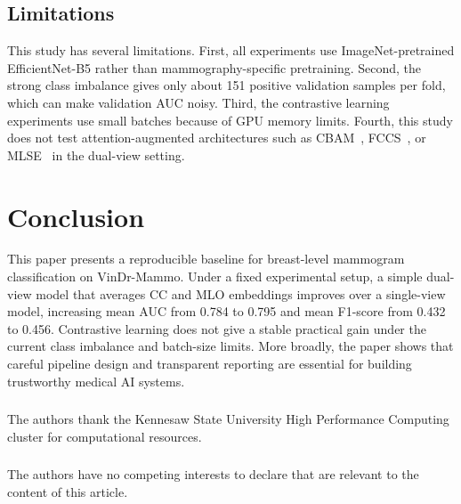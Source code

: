 \documentclass[runningheads]{llncs}
\begin{document}
\subsection{Limitations}

This study has several limitations. First, all experiments use ImageNet-pretrained EfficientNet-B5 rather than mammography-specific pretraining. Second, the strong class imbalance gives only about 151 positive validation samples per fold, which can make validation AUC noisy. Third, the contrastive learning experiments use small batches because of GPU memory limits. Fourth, this study does not test attention-augmented architectures such as CBAM~\cite{woo2018cbam}, FCCS~\cite{maurya2024fccs}, or MLSE~\cite{xie2026mlse} in the dual-view setting.

\section{Conclusion}
\label{sec:conclusion}

This paper presents a reproducible baseline for breast-level mammogram classification on VinDr-Mammo. Under a fixed experimental setup, a simple dual-view model that averages CC and MLO embeddings improves over a single-view model, increasing mean AUC from 0.784 to 0.795 and mean F1-score from 0.432 to 0.456. Contrastive learning does not give a stable practical gain under the current class imbalance and batch-size limits. More broadly, the paper shows that careful pipeline design and transparent reporting are essential for building trustworthy medical AI systems.

\begin{credits}
\subsubsection{\ackname}
The authors thank the Kennesaw State University High Performance Computing cluster for computational resources.

\subsubsection{\discintname}
The authors have no competing interests to declare that are relevant to the content of this article.
\end{credits}
\end{document}
